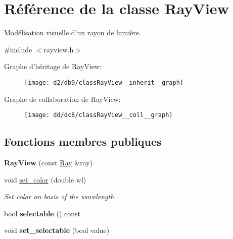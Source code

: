 \hypertarget{classRayView}{\section{Référence de la classe Ray\+View}
\label{classRayView}
}


Modélisation visuelle d’un rayon de lumière.  




{\ttfamily \#include $<$rayview.\+h$>$}



Graphe d'héritage de Ray\+View\+:\nopagebreak
\begin{figure}[H]
\begin{center}
\leavevmode
\texttt{[image: d2/db9/classRayView\_\_inherit\_\_graph]}
\end{center}
\end{figure}


Graphe de collaboration de Ray\+View\+:\nopagebreak
\begin{figure}[H]
\begin{center}
\leavevmode
\texttt{[image: dd/dc8/classRayView\_\_coll\_\_graph]}
\end{center}
\end{figure}
\subsection*{Fonctions membres publiques}
\begin{DoxyCompactItemize}
\item 
\hypertarget{classRayView_a8a8fc6d9d3751260edc9e07221706fdb}{{\bfseries Ray\+View} (const \hyperlink{classRay}{Ray} \&ray)}\label{classRayView_a8a8fc6d9d3751260edc9e07221706fdb}

\item 
void \hyperlink{classRayView_a7bb1f2437aae2fbe7fba8833c58eda73}{set\+\_\+color} (double wl)
\begin{DoxyCompactList}\small\item\em Set color on basis of the wavelength. \end{DoxyCompactList}\item 
\hypertarget{classRayView_a021ce03866641878a45e9c96e9aad847}{bool {\bfseries selectable} () const }\label{classRayView_a021ce03866641878a45e9c96e9aad847}

\item 
\hypertarget{classRayView_a42da015154d17e973599c1970efe42bc}{void {\bfseries set\+\_\+selectable} (bool value)}\label{classRayView_a42da015154d17e973599c1970efe42bc}

\end{DoxyCompactItemize}


